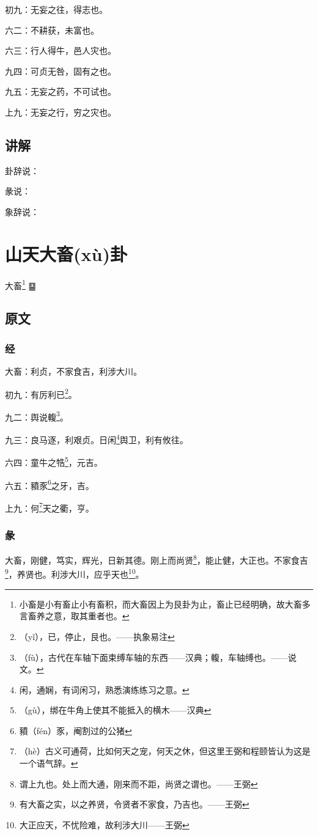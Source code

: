 \documentclass[12pt,oneside]{book}
\begin{document}
初九：无妄之往，得志也。

六二：不耕获，未富也。

六三：行人得牛，邑人灾也。

九四：可贞无咎，固有之也。

九五：无妄之药，不可试也。

上九：无妄之行，穷之灾也。

\section{讲解}
卦辞说：

彖说：

象辞说：


\chapter{山天大畜(xù)卦}
大畜\footnote{小畜是小有畜止小有畜积，而大畜因上为艮卦为止，畜止已经明确，故大畜多言畜养之意，取其重者也。} {\Large ䷙}

\section{原文}

\subsection{经}
大畜：利贞，不家食吉，利涉大川。

初九：有厉利已\footnote{（yǐ），已，停止，艮也。——执象易注}。

九二：舆说輹\footnote{（fù），古代在车轴下面束缚车轴的东西——汉典；輹，车轴缚也。——说文。}。

九三：良马逐，利艰贞。日闲\footnote{闲，通娴，有词闲习，熟悉演练练习之意。}舆卫，利有攸往。

六四：童牛之牿\footnote{（gù），绑在牛角上使其不能抵入的横木——汉典}，元吉。

六五：豶豕\footnote{豶（fén）豕，阉割过的公猪}之牙，吉。

上九：何\footnote{（hè）古义可通荷，比如何天之宠，何天之休，但这里王弼和程颐皆认为这是一个语气辞。}天之衢，亨。

\subsection{彖}
大畜，刚健，笃实，辉光，日新其德。刚上而尚贤\footnote{谓上九也。处上而大通，刚来而不距，尚贤之谓也。——王弼}，能止健，大正也。不家食吉\footnote{有大畜之实，以之养贤，令贤者不家食，乃吉也。——王弼}，养贤也。利涉大川，应乎天也\footnote{大正应天，不忧险难，故利涉大川——王弼}。
\end{document}
